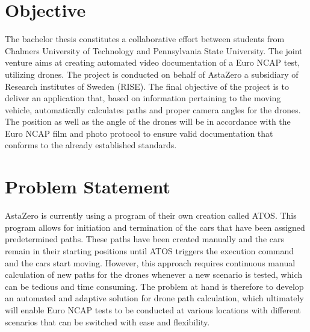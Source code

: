 \section{Objective}

The bachelor thesis constitutes a collaborative effort between students from Chalmers University of Technology and Pennsylvania State University. The joint venture aims at creating automated video documentation of a Euro NCAP test, utilizing drones. The project is conducted on behalf of AstaZero a subsidiary of Research institutes of Sweden (RISE). The final objective of the project is to deliver an application that, based on information pertaining to the moving vehicle, automatically calculates paths and proper camera angles for the drones. The position as well as the angle of the drones will be in accordance with the Euro NCAP film and photo protocol to ensure valid documentation that conforms to the already established standards. ~\cite{EuroNCAP2021EUROPEANPROTOCOL}
\bigskip
\newline 

\section{Problem Statement} \label{chap:problem statement}

AstaZero is currently using a program of their own creation called ATOS. This program allows for initiation and termination of the cars that have been assigned predetermined paths. These paths have been created manually and the cars remain in their starting positions until ATOS triggers the execution command and the cars start moving. However, this approach requires continuous manual calculation of new paths for the drones whenever a new scenario is tested, which can be tedious and time consuming. The problem at hand is therefore to develop an automated and adaptive solution for drone path calculation, which ultimately will enable Euro NCAP tests to be conducted at various locations with different scenarios that can be switched with ease and flexibility.
\bigskip
\newline

